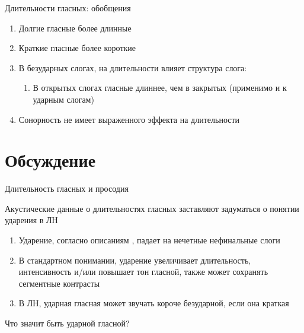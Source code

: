 \documentclass[10 pt, handout]{beamer}
\begin{document}
\begin{frame}{Длительности гласных: обобщения}

	\begin{enumerate}[\ding{166}]
		\item Долгие гласные более длинные
		\item Краткие гласные более короткие
		\item В безударных слогах, на длительности влияет структура слога:
			\begin{enumerate}[\ding{167}]
				\item В открытых слогах гласные длиннее, чем в закрытых (применимо и к ударным слогам)
			\end{enumerate}
		\item Сонорность не имеет выраженного эффекта на длительности
	\end{enumerate}

\end{frame}

	\section{Обсуждение}

\begin{frame}{Длительность гласных и просодия}

	Акустические данные о длительностях гласных заставляют задуматься о понятии ударения в ЛН
	\vspace*{1em}
	
	\begin{enumerate}[\ding{36}]
		\item Ударение, согласно описаниям \parencite{sammallahti1974, salminen2007}, падает на нечетные нефинальные слоги
		\item В стандартном понимании, ударение увеличивает длительность, интенсивность и/или повышает тон гласной, также может сохранять сегментные контрасты
		\item В ЛН, ударная гласная может звучать короче безударной, если она краткая
	\end{enumerate}
	
	\vspace*{1em}
	Что значит быть ударной гласной?

\end{frame}
\end{document}
